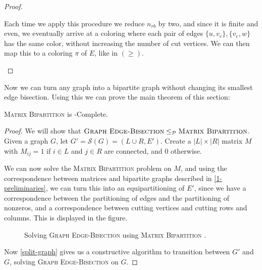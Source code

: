 \documentclass{article}
\newcommand{\mbpt}{\textsc{Matrix \allowbreak Bipartition} }
\newcommand{\geb}{\textsc{Graph \allowbreak Edge-\allowbreak Bisection} }
\begin{document}
\begin{proof}
\begin{enumerate}
					Each time we apply this procedure we reduce $n_{rb}$ by
					two, and since it is finite and even, we eventually arrive
					at a coloring where each pair of edges $\{u, v_e\},
					\{v_e, w\}$ has the same color, without increasing the
					number of cut vertices. We can then map this to
					a coloring $\pi$ of $E$, like in $(\geq)$.
		\end{enumerate}
	\end{proof}

	Now we can turn any graph into a bipartite graph without changing its
	smallest edge bisection. Using this we can prove the main theorem of this
	section:

	\begin{theorem}
		\label{main-thm}
		\mbpt is \NP-Complete.
	\end{theorem}
	\begin{proof}
		We will show that $\geb \leq_{\mathcal{P}} \mbpt$. Given a graph $G$,
		let $G'=\mathcal{S}(G)=(L\cup R, E')$. Create a $|L| \times |R|$ matrix
		$M$ with $M_{ij} = 1$ if $i \in L$ and $j \in R$ are connected, and $0$
		otherwise.

		We can now solve the \mbpt problem on $M$, and using the correspondence
		between matrices and bipartite graphs described in
		\autoref{1-preliminaries}, we can turn this into an equipartitioning of
		$E'$, since we have a correspondence between the partitioning of edges
		and the partitioning of nonzeros, and a correspondence between cutting
		vertices and cutting rows and columns. This is displayed in the figure.

		\begin{figure}[h]
			
			\centering
			\label{figmgeb}
			\caption{Solving \geb using \mbpt.}
		\end{figure}

		Now \autoref{split-graph} gives us a constructive algorithm to
		transition between $G'$ and $G$, solving \geb on $G$.
	\end{proof}
\end{document}
